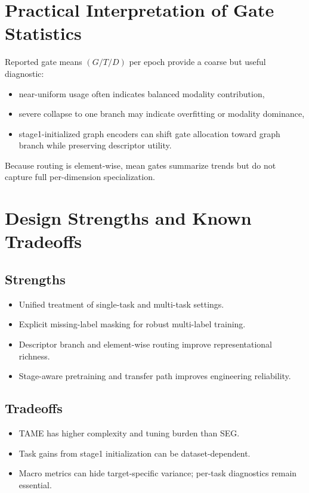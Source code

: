 \documentclass[11pt,a4paper]{article}
\begin{document}
\section{Practical Interpretation of Gate Statistics}
Reported gate means $(G/T/D)$ per epoch provide a coarse but useful diagnostic:
\begin{itemize}
    \item near-uniform usage often indicates balanced modality contribution,
    \item severe collapse to one branch may indicate overfitting or modality dominance,
    \item stage1-initialized graph encoders can shift gate allocation toward graph branch while preserving descriptor utility.
\end{itemize}

Because routing is element-wise, mean gates summarize trends but do not capture full per-dimension specialization.

\section{Design Strengths and Known Tradeoffs}
\subsection{Strengths}
\begin{itemize}
    \item Unified treatment of single-task and multi-task settings.
    \item Explicit missing-label masking for robust multi-label training.
    \item Descriptor branch and element-wise routing improve representational richness.
    \item Stage-aware pretraining and transfer path improves engineering reliability.
\end{itemize}

\subsection{Tradeoffs}
\begin{itemize}
    \item TAME has higher complexity and tuning burden than SEG.
    \item Task gains from stage1 initialization can be dataset-dependent.
    \item Macro metrics can hide target-specific variance; per-task diagnostics remain essential.
\end{itemize}
\end{document}
